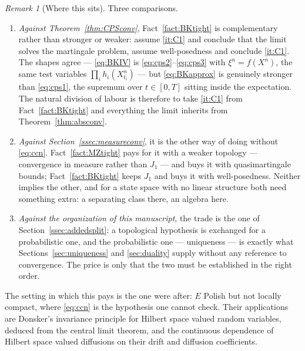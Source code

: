\documentclass[11pt,a4paper]{article}
\theoremstyle{plain}
\theoremstyle{definition}
\theoremstyle{remark}
\newtheorem{remark}[theorem]{Remark}
\newcommand{\CPS}{\cite{CPS23}}
\newcommand{\BK}{\cite{BK93}}
\begin{document}
\begin{remark}[Where this sits]
  \label{rem:BKvsCPS}
  Three comparisons.
  \begin{enumerate}[label=(\roman*)]
  \item \emph{Against Theorem~\ref{thm:CPSconv}}, Fact~\ref{fact:BKtight} is
    complementary rather than stronger or weaker: \CPS{} assume \ref{it:C1} and
    conclude that the limit solves the martingale problem, \BK{} assume
    well-posedness and conclude \ref{it:C1}.  The shapes agree --- \eqref{eq:BKIV}
    is \eqref{eq:cps2}--\eqref{eq:cps3} with $\xi^n = f(X^n)$, the same test
    variables $\prod_i h_i(X^n_{t_i})$ --- but \eqref{eq:BKapprox} is genuinely
    stronger than \eqref{eq:cps1}, the supremum over $t \in [0,T]$ sitting inside
    the expectation.  The natural division of labour is therefore to take
    \ref{it:C1} from Fact~\ref{fact:BKtight} and everything the limit inherits
    from Theorem~\ref{thm:absconv}.
  \item \emph{Against Section~\ref{ssec:measureconv}}, it is the other way of
    doing without \eqref{eq:ccn}.  Fact~\ref{fact:MZtight} pays for it with a
    weaker topology --- convergence in measure rather than $J_1$ --- and buys it
    with quasimartingale bounds; Fact~\ref{fact:BKtight} keeps $J_1$ and buys it
    with well-posedness.  Neither implies the other, and for a state space with
    no linear structure both need something extra: a separating class there, an
    algebra here.
  \item \emph{Against the organization of this manuscript}, the trade is the one
    of Section~\ref{ssec:addedsplit}: a topological hypothesis is exchanged
    for a probabilistic one, and the probabilistic one --- uniqueness --- is
    exactly what Sections~\ref{sec:uniqueness} and \ref{sec:duality} supply
    without any reference to convergence.  The price is only that the two must be
    established in the right order.
  \end{enumerate}
  The setting in which this pays is the one \BK{} were after: $E$ Polish but not
  locally compact, where \eqref{eq:ccn} is the hypothesis one cannot check.
  Their applications are Donsker's invariance principle for Hilbert space valued
  random variables, deduced from the central limit theorem, and the continuous
  dependence of Hilbert space valued diffusions on their drift and diffusion
  coefficients.
\end{remark}
\end{document}
